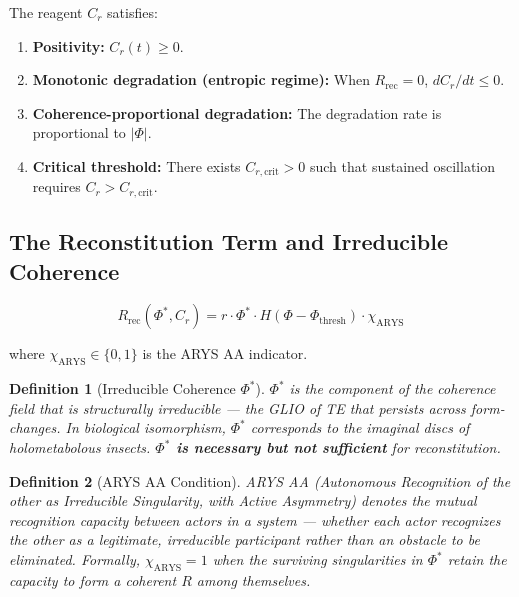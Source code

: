 \documentclass[12pt,a4paper]{article}
\newtheorem{definition}{Definition}[section]
\newcommand{\reag}{C_r}
\newcommand{\reagcrit}{C_{r,\mathrm{crit}}}
\newcommand{\Phistar}{\Phi^{*}}
\newcommand{\Phithresh}{\Phi_{\mathrm{thresh}}}
\begin{document}
The reagent $\reag$ satisfies:

\begin{enumerate}[label=\textbf{R\arabic*.}]
    \item \textbf{Positivity:} $\reag(t) \geq 0$.
    \item \textbf{Monotonic degradation (entropic regime):} When $R_{\mathrm{rec}} = 0$, $d\reag/dt \leq 0$.
    \item \textbf{Coherence-proportional degradation:} The degradation rate is proportional to $|\Phi|$.
    \item \textbf{Critical threshold:} There exists $\reagcrit > 0$ such that sustained oscillation requires $\reag > \reagcrit$.
\end{enumerate}

\subsection{The Reconstitution Term and Irreducible Coherence}

\begin{equation}\label{eq:reconstitution}
R_{\mathrm{rec}}(\Phistar, \reag) = r \cdot \Phistar \cdot H(\Phi - \Phithresh) \cdot \chi_{\mathrm{ARYS}}
\end{equation}

\noindent where $\chi_{\mathrm{ARYS}} \in \{0,1\}$ is the ARYS AA indicator.

\begin{definition}[Irreducible Coherence $\Phistar$]\label{def:phistar}
$\Phistar$ is the component of the coherence field that is structurally irreducible --- the GLIO of TE that persists across form-changes. In biological isomorphism, $\Phistar$ corresponds to the imaginal discs of holometabolous insects. \textbf{$\Phistar$ is necessary but not sufficient} for reconstitution.
\end{definition}

\begin{definition}[ARYS AA Condition]\label{def:arys}
ARYS AA (Autonomous Recognition of the other as Irreducible Singularity, with Active Asymmetry) denotes the mutual recognition capacity between actors in a system --- whether each actor recognizes the other as a legitimate, irreducible participant rather than an obstacle to be eliminated. Formally, $\chi_{\mathrm{ARYS}} = 1$ when the surviving singularities in $\Phistar$ retain the capacity to form a coherent $R$ among themselves.
\end{definition}
\end{document}
